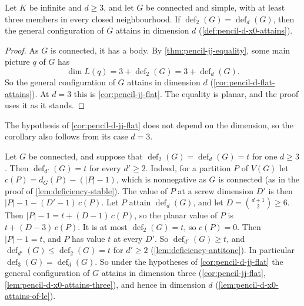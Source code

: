 \begin{corollary}
  \label{cor:pencil-d-jj-flat}
  \leanok
  Let $K$ be infinite and $d \ge 3$, and let $G$ be connected and simple,
  with at least three members in every closed neighbourhood. If
  $\operatorname{def}_2(G) = \operatorname{def}_d(G)$, then the general
  configuration of $G$ attains in dimension $d$
  (\cref{def:pencil-d-x0-attains}).
\end{corollary}
\begin{proof}
  \leanok
  As $G$ is connected, it has a body. By \cref{thm:pencil-jj-equality},
  some main picture $q$ of $G$ has
  \[
    \dim L(q) = 3 + \operatorname{def}_2(G) = 3 + \operatorname{def}_d(G).
  \]
  So the general configuration of $G$ attains in dimension $d$
  (\cref{cor:pencil-d-flat-attains}). At $d = 3$ this is
  \cref{cor:pencil-jj-flat}. The equality is planar, and the proof uses
  it as it stands.
\end{proof}

The hypothesis of \cref{cor:pencil-d-jj-flat} does not depend on the
dimension, so the corollary also follows from its case $d = 3$.

\begin{remark}
  \label{rem:pencil-d-flat-class}
  Let $G$ be connected, and suppose that
  $\operatorname{def}_2(G) = \operatorname{def}_d(G) = t$ for one
  $d \ge 3$. Then $\operatorname{def}_{d'}(G) = t$ for every $d' \ge 2$.
  Indeed, for a partition $P$ of $V(G)$ let
  $c(P) = d_G(P) - (|P| - 1)$, which is nonnegative as $G$ is connected
  (as in the proof of \cref{lem:deficiency-stable}). The value of $P$ at
  a screw dimension $D'$ is then $|P| - 1 - (D' - 1)\,c(P)$. Let $P$
  attain $\operatorname{def}_d(G)$, and let $D = \binom{d+1}{2} \ge 6$.
  Then $|P| - 1 = t + (D - 1)\,c(P)$, so the planar value of $P$ is
  $t + (D - 3)\,c(P)$. It is at most $\operatorname{def}_2(G) = t$, so
  $c(P) = 0$. Then $|P| - 1 = t$, and $P$ has value $t$ at every $D'$.
  So $\operatorname{def}_{d'}(G) \ge t$, and
  $\operatorname{def}_{d'}(G) \le \operatorname{def}_2(G) = t$ for
  $d' \ge 2$ (\cref{lem:deficiency-antitone}). In particular
  $\operatorname{def}_3(G) = \operatorname{def}_d(G)$. So under the
  hypotheses of \cref{cor:pencil-d-jj-flat} the general configuration of
  $G$ attains in dimension three (\cref{cor:pencil-jj-flat},
  \cref{lem:pencil-d-x0-attains-three}), and hence in dimension $d$
  (\cref{lem:pencil-d-x0-attains-of-le}).
\end{remark}

